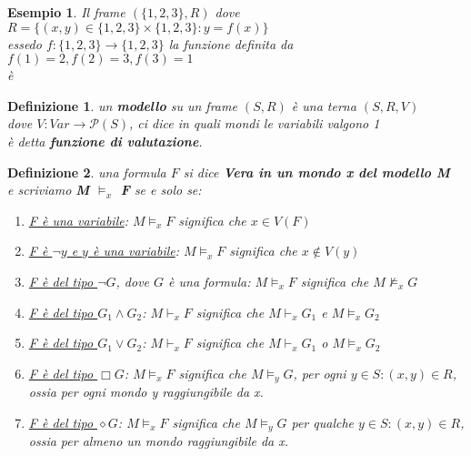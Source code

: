 \documentclass[a4paper,12pt]{article}
\theoremstyle{def}
\newtheorem*{definition}{Definizione}
\theoremstyle{prop}
\theoremstyle{esempio}
\newtheorem*{example}{Esempio}
\theoremstyle{dimostrazione}
\theoremstyle{teo}
\theoremstyle{osservazione}
\begin{document}
\begin{example}
	Il frame \((\{1,2,3\}, R)\) dove \(R = \{(x,y) \in \{1,2,3\} \times \{1,2,3\} : y=f(x)\}\)\\
	essedo \(f : \{1,2,3\} \rightarrow \{1,2,3\}\) la funzione definita da \(f(1) = 2, f(2) = 3, f(3) = 1\)\\
	è
	\begin{center}
	\end{center}
\end{example}
\begin{definition}
	un \textbf{modello} su un frame \((S,R)\) è una terna \((S,R,V)\)\\
	dove \(V : Var \rightarrow \mathcal{P}(S) \), ci dice in quali mondi le variabili valgono 1\\
	è detta \textbf{funzione di valutazione}.
\end{definition}
\begin{definition}
	una formula \(F\) si dice \textbf{Vera in un mondo x del modello M}\\
	e scriviamo \textbf{M \(\vDash_x\) F} se e solo se:
	\begin{enumerate}
		\item \underline{F è una variabile}: \(M \vDash_x F\) significa che \(x \in V(F)\)
		\item \underline{ F è \(\neg y\) e \(y\) è una variabile}: \(M \vDash_x F\) significa che \(x \notin V(y)\)
		\item \underline{F è del tipo \(\neg G\)}, dove \(G\) è una formula: \(M \vDash_x F\) significa che \(M \nvDash_x G\)
		\item \underline{F è del tipo \(G_1 \land G_2\)}: \(M \vdash_x F\) significa che \(M \vdash_x G_1\) e \(M \vDash_x G_2\)
		\item \underline{F è del tipo \(G_1 \lor G_2\)}: \(M \vdash_x F\) significa che \(M \vdash_x G_1\) o \(M \vDash_x G_2\)
		\item \underline{F è del tipo \(\Box G\)}: \(M \vDash_x F\) significa che \(M \vDash_y G\), per ogni \(y \in S : (x,y) \in R\),\\
		      ossia per ogni mondo y raggiungibile da x.
		\item \underline{F è del tipo \(\diamond G\)}: \(M \vDash_x F\) significa che \(M \vDash_y G\) per qualche \(y \in S : (x,y) \in R\),\\
		      ossia per almeno un mondo raggiungibile da x.
	\end{enumerate}
\end{definition}
\end{document}
